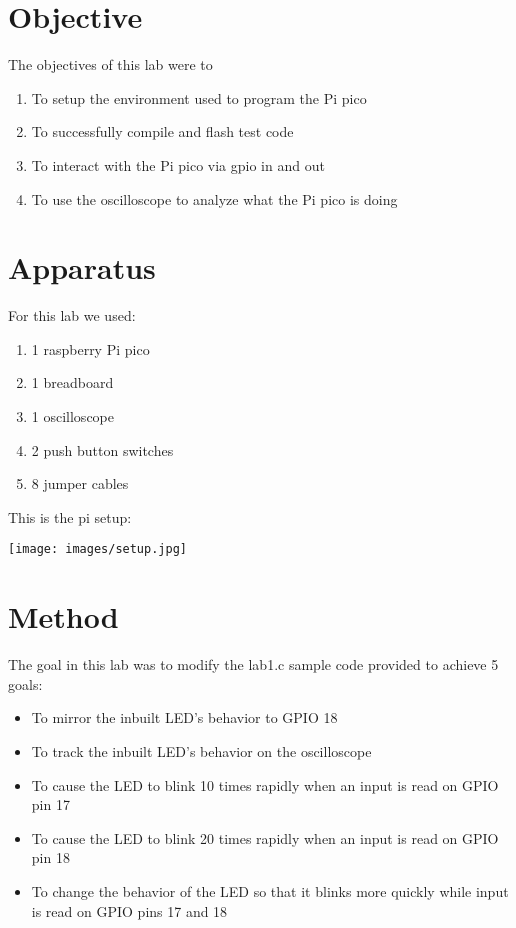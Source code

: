 \documentclass[sigconf]{article}
\begin{document}
\section{Objective}

The objectives of this lab were to 
\begin{enumerate}
  \item To setup the environment used to program the Pi pico
  \item To successfully compile and flash test code
  \item To interact with the Pi pico via gpio in and out
  \item To use the oscilloscope to analyze what the Pi pico is doing
\end{enumerate}

\clearpage
\section{Apparatus}

For this lab we used:
\begin{enumerate}
  \item 1 raspberry Pi pico 
  \item 1 breadboard
  \item 1 oscilloscope
  \item 2 push button switches
  \item 8 jumper cables
\end{enumerate}

This is the pi setup:

\texttt{[image: images/setup.jpg]}

\clearpage
\section{Method}

The goal in this lab was to modify the lab1.c sample code provided to achieve 5 goals:
\begin{itemize}
  \item To mirror the inbuilt LED's behavior to GPIO 18
  \item To track the inbuilt LED's behavior on the oscilloscope
  \item To cause the LED to blink 10 times rapidly when an input is read on GPIO pin 17
  \item To cause the LED to blink 20 times rapidly when an input is read on GPIO pin 18
  \item To change the behavior of the LED so that it blinks more quickly while input is read on GPIO pins 17 and 18
\end{itemize}
\end{document}
